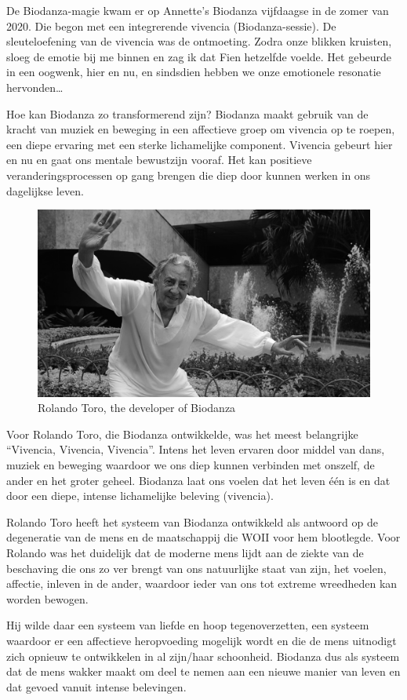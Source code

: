 \documentclass[
  11pt,
]{book}
\begin{document}
De Biodanza-magie kwam er op Annette's Biodanza vijfdaagse in de zomer van 2020. Die begon met een integrerende vivencia (Biodanza-sessie). De sleuteloefening van de vivencia was de ontmoeting. Zodra onze blikken kruisten, sloeg de emotie bij me binnen en zag ik dat Fien hetzelfde voelde. Het gebeurde in een oogwenk, hier en nu, en sindsdien hebben we onze emotionele resonatie hervonden\ldots{}

Hoe kan Biodanza zo transformerend zijn? Biodanza maakt gebruik van de kracht van muziek en beweging in een affectieve groep om vivencia op te roepen, een diepe ervaring met een sterke lichamelijke component. Vivencia gebeurt hier en nu en gaat ons mentale bewustzijn vooraf. Het kan positieve veranderingsprocessen op gang brengen die diep door kunnen werken in ons dagelijkse leven.

\begin{figure}

{\centering \includegraphics[width=0.45\linewidth]{./figs/rolando} 

}

\caption{Rolando Toro, the developer of Biodanza}\label{fig:rolandoToro}
\end{figure}

Voor Rolando Toro, die Biodanza ontwikkelde, was het meest belangrijke ``Vivencia, Vivencia, Vivencia''. Intens het leven ervaren door middel van dans, muziek en beweging waardoor we ons diep kunnen verbinden met onszelf, de ander en het groter geheel. Biodanza laat ons voelen dat het leven één is en dat door een diepe, intense lichamelijke beleving (vivencia).

Rolando Toro heeft het systeem van Biodanza ontwikkeld als antwoord op de degeneratie van de mens en de maatschappij die WOII voor hem blootlegde. Voor Rolando was het duidelijk dat de moderne mens lijdt aan de ziekte van de beschaving die ons zo ver brengt van ons natuurlijke staat van zijn, het voelen, affectie, inleven in de ander, waardoor ieder van ons tot extreme wreedheden kan worden bewogen.

Hij wilde daar een systeem van liefde en hoop tegenoverzetten, een systeem waardoor er een affectieve heropvoeding mogelijk wordt en die de mens uitnodigt zich opnieuw te ontwikkelen in al zijn/haar schoonheid. Biodanza dus als systeem dat de mens wakker maakt om deel te nemen aan een nieuwe manier van leven en dat gevoed vanuit intense belevingen.
\end{document}
